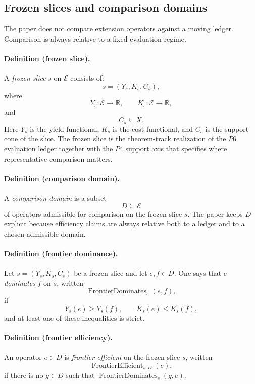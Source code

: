 \documentclass[11pt]{article}
\begin{document}
\subsection*{Frozen slices and comparison domains}

The paper does not compare extension operators against a moving ledger. Comparison is always relative to a fixed evaluation regime.

\paragraph{Definition (frozen slice).}
A \emph{frozen slice} $s$ on $\mathcal{E}$ consists of:
\[
s=(Y_s,K_s,C_s),
\]
where
\[
Y_s \colon \mathcal{E}\to \mathbb{R},\qquad
K_s \colon \mathcal{E}\to \mathbb{R},
\]
and
\[
C_s \subseteq X.
\]
Here $Y_s$ is the yield functional, $K_s$ is the cost functional, and $C_s$ is the support cone of the slice. The frozen slice is the theorem-track realization of the \(P6\) evaluation ledger together with the \(P4\) support axis that specifies where representative comparison matters.

\paragraph{Definition (comparison domain).}
A \emph{comparison domain} is a subset
\[
D\subseteq \mathcal{E}
\]
of operators admissible for comparison on the frozen slice $s$. The paper keeps $D$ explicit because efficiency claims are always relative both to a ledger and to a chosen admissible domain.

\paragraph{Definition (frontier dominance).}
Let $s=(Y_s,K_s,C_s)$ be a frozen slice and let $e,f\in D$. One says that $e$ \emph{dominates} $f$ on $s$, written
\[
\operatorname{FrontierDominates}_s(e,f),
\]
if
\[
Y_s(e)\ge Y_s(f),\qquad K_s(e)\le K_s(f),
\]
and at least one of these inequalities is strict.

\paragraph{Definition (frontier efficiency).}
An operator $e\in D$ is \emph{frontier-efficient} on the frozen slice $s$, written
\[
\operatorname{FrontierEfficient}_{s,D}(e),
\]
if there is no $g\in D$ such that $\operatorname{FrontierDominates}_s(g,e)$.
\end{document}
